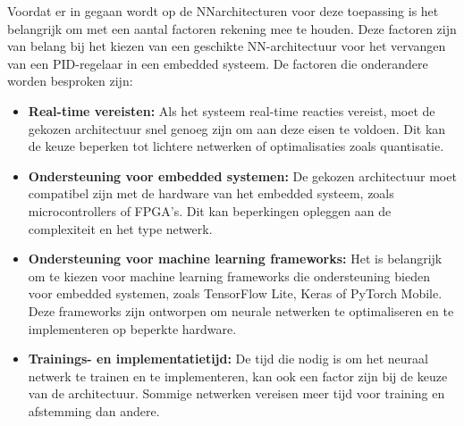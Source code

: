 Voordat er in gegaan wordt op de NNarchitecturen voor deze toepassing is het belangrijk om met een aantal factoren rekening mee te houden. Deze factoren zijn van belang bij het kiezen van een geschikte NN-architectuur voor het vervangen van een PID-regelaar in een embedded systeem. De factoren die onderandere worden besproken zijn:
\begin{itemize}
  \item \textbf{Real-time vereisten:} Als het systeem real-time reacties vereist, moet de gekozen architectuur snel genoeg zijn om aan deze eisen te voldoen. Dit kan de keuze beperken tot lichtere netwerken of optimalisaties zoals quantisatie.
  \item \textbf{Ondersteuning voor embedded systemen:} De gekozen architectuur moet compatibel zijn met de hardware van het embedded systeem, zoals microcontrollers of FPGA's. Dit kan beperkingen opleggen aan de complexiteit en het type netwerk.
  \item \textbf{Ondersteuning voor machine learning frameworks:} Het is belangrijk om te kiezen voor machine learning frameworks die ondersteuning bieden voor embedded systemen, zoals TensorFlow Lite, Keras of PyTorch Mobile. Deze frameworks zijn ontworpen om neurale netwerken te optimaliseren en te implementeren op beperkte hardware.
  \item \textbf{Trainings- en implementatietijd:} De tijd die nodig is om het neuraal netwerk te trainen en te implementeren, kan ook een factor zijn bij de keuze van de architectuur. Sommige netwerken vereisen meer tijd voor training en afstemming dan andere.
\end{itemize}


